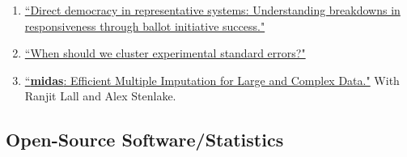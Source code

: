 \documentclass[11pt, a4paper]{article}
\begin{document}
\begin{enumerate}

\item \href{https://ts-robinson.com/publication/robinson-directdemocracyrepresentative-2020/robinson-directdemocracyrepresentative-2020.pdf}{``Direct democracy in representative systems: Understanding breakdowns in responsiveness through ballot initiative success."} 


\item \href{https://ts-robinson.com/publication/robinson-whenshouldwe-2020/robinson-whenshouldwe-2020.pdf}{``When should we cluster experimental standard errors?" }

\item \href{}{``\textbf{midas}: Efficient Multiple Imputation for Large and Complex Data."} With Ranjit Lall and Alex Stenlake.

\end{enumerate}

\subsection*{Open-Source Software/Statistics}
\end{document}
